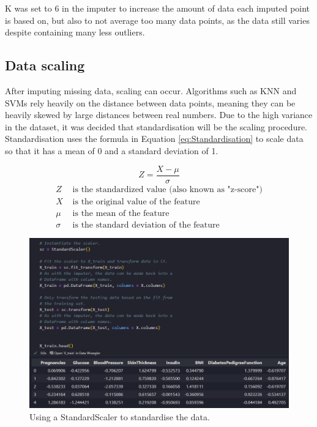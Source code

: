 \documentclass[12pt]{report}
\newcommand{\para}{\vspace{8pt}\noindent}
\begin{document}
\para K was set to 6 in the imputer to increase the amount of data each imputed point is based on, but also to not average 
too many data points, as the data still varies despite containing many less outliers. 

\subsection{Data scaling}
After imputing missing data, scaling can occur. Algorithms such as KNN and SVMs rely heavily on the distance 
between data points, meaning they can be heavily skewed by large distances between real numbers. Due to the high 
variance in the dataset, it was decided that standardisation will be the scaling procedure. Standardisation uses the 
formula in Equation \ref{eq:Standardisation} to scale data so that it has a mean of 0 and a standard deviation of 1.

\begin{equation}\label{eq:Standardisation}
    Z = \frac{X - \mu}{\sigma}
\end{equation}
\begin{align*}
    Z & \text{ is the standardized value (also known as "z-score")} \\
    X & \text{ is the original value of the feature} \\
    \mu & \text{ is the mean of the feature} \\
    \sigma & \text{ is the standard deviation of the feature}
\end{align*}

\begin{figure}[H]
    \centering
    \includegraphics[width=\linewidth]{Preprocessing/Standardisation.png}
    \caption{Using a StandardScaler to standardise the data.}
    \label{fig:Standardisation}
\end{figure}
\end{document}

